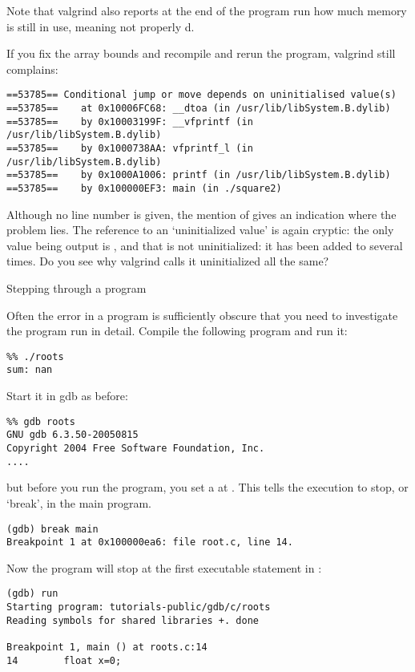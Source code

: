 Note that valgrind also reports at the end of the program run how much
memory is still in use, meaning not properly d.

If you fix the array bounds and recompile and rerun the program,
valgrind still complains:
{\small
\begin{verbatim}
==53785== Conditional jump or move depends on uninitialised value(s)
==53785==    at 0x10006FC68: __dtoa (in /usr/lib/libSystem.B.dylib)
==53785==    by 0x10003199F: __vfprintf (in /usr/lib/libSystem.B.dylib)
==53785==    by 0x1000738AA: vfprintf_l (in /usr/lib/libSystem.B.dylib)
==53785==    by 0x1000A1006: printf (in /usr/lib/libSystem.B.dylib)
==53785==    by 0x100000EF3: main (in ./square2)
\end{verbatim}
}
Although no line number is given, the mention of  gives an
indication where the problem lies.
The reference to an `uninitialized value' is again cryptic: the only
value being output is , and that is not uninitialized: it has
been added to several times. Do you see why valgrind calls it
uninitialized all the same?


 {Stepping through a program}

Often the error in a program is sufficiently obscure that you need to
investigate the program run in detail. Compile the following program
%
%
and run it:
\begin{verbatim}
%% ./roots
sum: nan
\end{verbatim}
Start it in gdb as before:
\begin{verbatim}
%% gdb roots
GNU gdb 6.3.50-20050815 
Copyright 2004 Free Software Foundation, Inc.
....
\end{verbatim}
but before you run the program, you set a 
at .
This tells the execution to stop, or `break', in the main program.
\begin{verbatim}
(gdb) break main
Breakpoint 1 at 0x100000ea6: file root.c, line 14.
\end{verbatim}
Now the program will stop at the first executable statement in :
\begin{verbatim}
(gdb) run
Starting program: tutorials-public/gdb/c/roots
Reading symbols for shared libraries +. done

Breakpoint 1, main () at roots.c:14
14        float x=0;
\end{verbatim}

